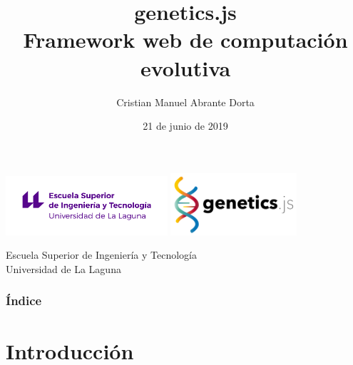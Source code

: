 \documentclass{beamer}
\title[genetics.js]{
    genetics.js \\
    Framework web de computación evolutiva
}
\author[Cristian Abrante]{Cristian Manuel Abrante Dorta}
\institute[ULL]{Universidad de La Laguna}
\date[21-06-2019]{21 de junio de 2019}
\begin{document}
  
\begin{frame}

  \includegraphics[width=0.45\textwidth]{pres/img/etsit-logo.png}
  \hspace*{2cm}
  \includegraphics[width=0.35\textwidth]{pres/img/geneticsjs-logo.png}
  \titlepage

  \begin{scriptsize}
    \begin{center}
     Escuela Superior de Ingeniería y Tecnología \\
     Universidad de La Laguna
    \end{center}
  \end{scriptsize}

\end{frame}

\begin{frame}[allowframebreaks]
  \frametitle{Índice}  
  \tableofcontents[sections={1-3}]
  \framebreak
  \tableofcontents[sections={4-6}]
\end{frame}



\section{Introducción}
\end{document}
